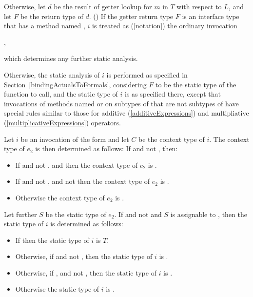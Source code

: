 \documentclass[makeidx]{article}
\begin{document}
{\LMHash{}%
Otherwise, let $d$ be the result of getter lookup
for $m$ in $T$ with respect to $L$,
and let $F$ be the return type of $d$.
()
If the getter return type $F$ is an interface type
that has a method named \CALL,
$i$ is treated as
(\ref{notation})
the ordinary invocation

\noindent
{},

\noindent
which determines any further static analysis.

\LMHash{}%
Otherwise, the static analysis of $i$ is performed
as specified in Section~\ref{bindingActualsToFormals},
considering $F$ to be the static type of the function to call,
and the static type of $i$ is as specified there,
except that invocations of methods named 
or  on subtypes of  that are not subtypes of 
have special rules similar to those for additive (\ref{additiveExpressions})
and multipliative (\ref{multiplicativeExpressions}) operators.

\LMHash{}%
Let $i$ be an invocation of the form 
and let $C$ be the context type of $i$.
The context type of $e_2$ is then determined as follows:
If  and not , then:
\begin{itemize}
  \item{} If  and not ,
      and 
      then the context type of $e_2$ is .
  \item{} If  and not ,
      and not 
     then the context type of $e_2$ is .
  \item{} Otherwise the context type of $e_2$ is .
\end{itemize}
Let further $S$ be the static type of $e_2$.
If  and not 
and $S$ is assignable to ,
then the static type of $i$ is determined as follows:
\begin{itemize}
  \item{} If 
    then the static type of $i$ is $T$.
  \item{} Otherwise, if 
    and not ,
    then the static type of $i$ is .
  \item{} Otherwise, if ,
     and not ,
    then the static type of $i$ is .
  \item{} Otherwise the static type of $i$ is .
\end{itemize}

}
\end{document}
